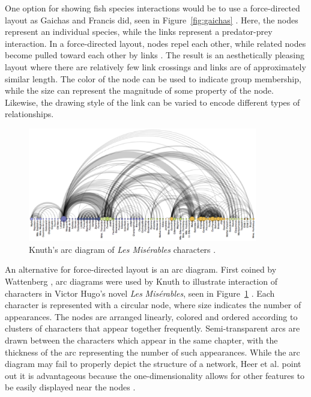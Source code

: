 
One option for showing fish species interactions would be to use a force-directed layout as Gaichas and Francis did, seen in Figure~\ref{fig:gaichas} \cite{gaichas2008}.  Here, the nodes represent an individual species, while the links represent a predator-prey interaction.  In a force-directed layout, nodes repel each other, while related nodes become pulled toward each other by links \cite{heer2010}.  The result is an aesthetically pleasing layout where there are relatively few link crossings and links are of approximately similar length.  The color of the node can be used to indicate group membership, while the size can represent the magnitude of some property of the node.  Likewise, the drawing style of the link can be varied to encode different types of relationships. 

\begin{figure}[h]
	\centering
	\includegraphics[width=10cm]{figures/eps/arcdiagram.eps}
	\caption{Knuth's arc diagram of \textit{Les Mis\'erables} characters \cite{knuth1993}.}
	\label{fig:arcdiagram}
\end{figure}

An alternative for force-directed layout is an arc diagram.  First coined by Wattenberg \cite{wattenberg2002}, arc diagrams were used by Knuth to illustrate interaction of characters in Victor Hugo's novel \textit{Les} \textit{Mis\'erables}, seen in Figure~\ref{fig:arcdiagram} \cite{knuth1993}.  Each character is represented with a circular node, where size indicates the number of appearances.  The nodes are arranged linearly, colored and ordered according to clusters of characters that appear together frequently.  Semi-transparent arcs are drawn between the characters which appear in the same chapter, with the thickness of the arc representing the number of such appearances.  While the arc diagram may fail to properly depict the structure of a network, Heer et al. point out it is advantageous because the one-dimensionality allows for other features to be easily displayed near the nodes \cite{heer2010}.  %

